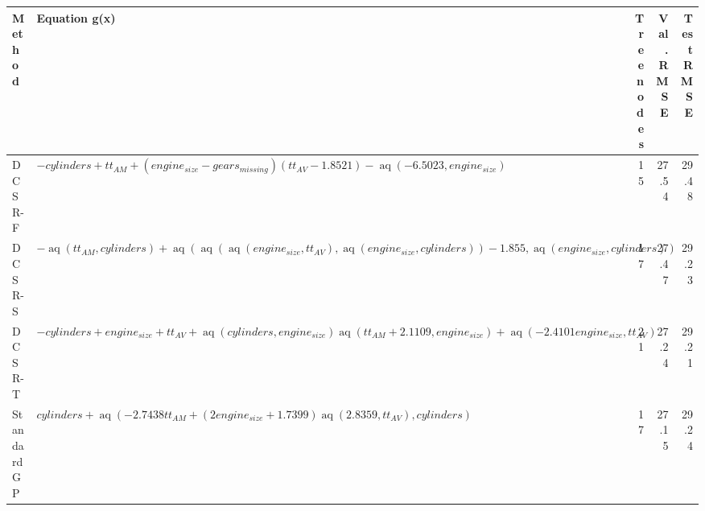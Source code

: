 \begin{tabular}{lp{8cm}rrr}
\toprule
Method & Equation g(x) & Tree nodes & Val. RMSE & Test RMSE \\
\midrule
DCSR-F & $- cylinders + tt_{AM} + \left(engine_{size} - gears_{missing}\right) \left(tt_{AV} - 1.8521\right) - \operatorname{aq}{\left(-6.5023,engine_{size} \right)}$ & 15 & 27.54 & 29.48 \\
DCSR-S & $- \operatorname{aq}{\left(tt_{AM},cylinders \right)} + \operatorname{aq}{\left(\operatorname{aq}{\left(\operatorname{aq}{\left(engine_{size},tt_{AV} \right)},\operatorname{aq}{\left(engine_{size},cylinders \right)} \right)} - 1.855,\operatorname{aq}{\left(engine_{size},cylinders \right)} \right)}$ & 17 & 27.47 & 29.23 \\
DCSR-T & $- cylinders + engine_{size} + tt_{AV} + \operatorname{aq}{\left(cylinders,engine_{size} \right)} \operatorname{aq}{\left(tt_{AM} + 2.1109,engine_{size} \right)} + \operatorname{aq}{\left(- 2.4101 engine_{size},tt_{AV} \right)}$ & 21 & 27.24 & 29.21 \\
Standard GP & $cylinders + \operatorname{aq}{\left(- 2.7438 tt_{AM} + \left(2 engine_{size} + 1.7399\right) \operatorname{aq}{\left(2.8359,tt_{AV} \right)},cylinders \right)}$ & 17 & 27.15 & 29.24 \\
\bottomrule
\end{tabular}

